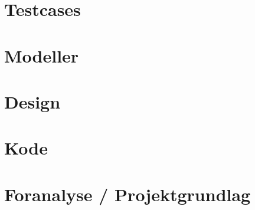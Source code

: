 \documentclass[12pt, a4paper]{report}
\begin{document}
\section{Testcases}


\section{Modeller}


\section{Design}


\section{Kode}


\section{Foranalyse / Projektgrundlag}

\end{document}
